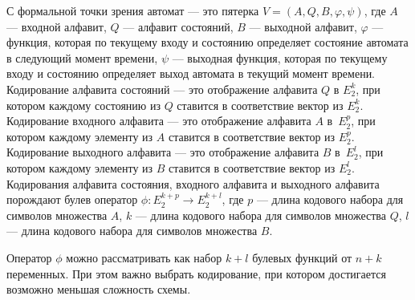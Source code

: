 \par С формальной точки зрения автомат --- это пятерка  $V=(A,Q,B,\varphi,\psi)$,
где  $A$ --- входной алфавит, $Q$ --- алфавит состояний, $B$ ---
выходной алфавит, $\varphi$ --- функция, которая по текущему входу и
состоянию определяет состояние автомата в следующий момент времени,
$\psi$ --- выходная функция, которая по текущему входу и состоянию
определяет выход автомата в текущий момент времени. Кодирование
алфавита состояний --- это отображение алфавита $Q$ в $E_2^k$, при
котором каждому состоянию из $Q$ ставится в соответствие вектор из
$E_2^k$. Кодирование входного алфавита --- это отображение алфавита
$A$ в~$E_2^p$, при котором каждому элементу из $A$ ставится в
соответствие вектор из $E_2^p$. Кодирование выходного алфавита ---
это отображение алфавита $B$ в~$E_2^l$, при котором каждому элементу
из $B$ ставится в соответствие вектор из $E_2^l$. Кодирования
алфавита состояния, входного алфавита и выходного алфавита порождают
булев оператор $\phi: E_2^{k+p}\rightarrow E_2^{k+l}$, где $p$ ---
длина кодового набора для символов множества $A$, $k$ --- длина
кодового набора для символов множества $Q$, $l$ --- длина кодового
набора для символов множества $B$.

Оператор $\phi$ можно рассматривать как набор $k+l$ булевых функций
от $n+k$ переменных. При этом важно выбрать кодирование, при котором достигается возможно меньшая сложность схемы. 



